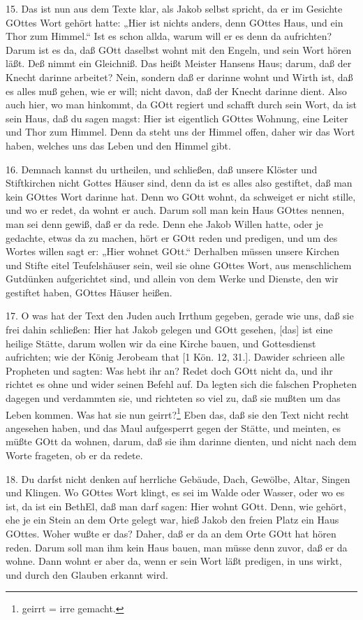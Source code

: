15. Das ist nun aus dem Texte klar, als Jakob selbst spricht, da er im Gesichte GOttes Wort gehört hatte: „Hier ist nichts anders, denn GOttes Haus, und ein Thor zum Himmel.“ Ist es schon allda, warum will er es denn da aufrichten? Darum ist es da, daß GOtt daselbst wohnt mit den Engeln, und sein Wort hören läßt. Deß nimmt ein Gleichniß. Das heißt Meister Hansens Haus; darum, daß der Knecht darinne arbeitet? Nein, sondern daß er darinne wohnt und Wirth ist, daß es alles muß gehen, wie er will; nicht davon, daß der Knecht darinne dient. Also auch hier, wo man hinkommt, da
GOtt regiert und schafft durch sein Wort, da ist sein Haus, daß du sagen magst: Hier ist eigentlich GOttes Wohnung, eine Leiter und Thor zum Himmel. Denn da steht uns der Himmel offen, daher wir das Wort haben, welches uns das Leben und den Himmel gibt.

16. Demnach kannst du urtheilen, und schließen, daß unsere Klöster und Stiftkirchen nicht Gottes Häuser sind, denn da ist es alles also gestiftet, daß man kein GOttes Wort darinne hat. Denn wo GOtt wohnt, da schweiget er nicht stille, und wo er redet, da wohnt er auch. Darum soll man kein Haus GOttes nennen, man sei denn gewiß, daß er da rede. Denn ehe Jakob Willen hatte, oder je gedachte, etwas da zu machen, hört er GOtt reden und predigen, und um des Wortes willen sagt er: „Hier wohnet GOtt.“ Derhalben müssen unsere Kirchen und Stifte eitel Teufelshäuser sein, weil sie ohne GOttes Wort, aus menschlichem Gutdünken aufgerichtet sind, und allein von dem Werke und Dienste, den wir gestiftet haben, GOttes Häuser heißen.

17. O was hat der Text den Juden auch Irrthum gegeben, gerade wie uns, daß sie frei dahin schließen: Hier hat Jakob gelegen und GOtt gesehen, [das] ist eine heilige Stätte, darum wollen wir da eine Kirche bauen, und Gottesdienst aufrichten; wie der König Jerobeam that [1 Kön. 12, 31.]. Dawider schrieen alle Propheten und sagten: Was hebt ihr an? Redet doch GOtt nicht da, und ihr richtet es ohne und wider seinen Befehl auf. Da legten sich die falschen Propheten dagegen und verdammten sie, und richteten so viel zu, daß sie mußten um das Leben kommen. Was hat sie nun geirrt?\footnote{geirrt = irre gemacht.} Eben das, daß sie den Text nicht recht angesehen haben, und das Maul aufgesperrt gegen der Stätte, und meinten, es müßte GOtt da wohnen, darum, daß sie ihm darinne dienten, und nicht nach dem Worte frageten, ob er da redete.

18. Du darfst nicht denken auf herrliche Gebäude, Dach, Gewölbe, Altar, Singen und Klingen. Wo GOttes Wort klingt, es sei im Walde oder Wasser, oder wo es ist, da ist ein BethEl, daß man darf sagen: Hier wohnt GOtt. Denn, wie gehört, ehe je ein Stein an dem Orte gelegt war, hieß Jakob den freien Platz ein Haus GOttes. Woher wußte er das? Daher, daß er da an dem Orte GOtt hat hören reden. Darum soll man ihm kein Haus bauen, man müsse denn zuvor, daß er da wohne. Dann wohnt er aber da, wenn er sein Wort läßt predigen, in uns wirkt, und durch den Glauben erkannt wird.


